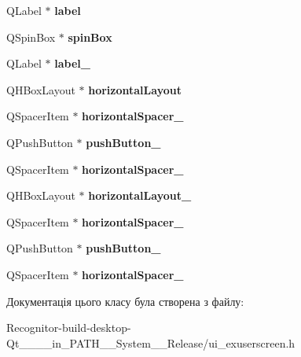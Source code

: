 \begin{DoxyCompactItemize}
\item 
\hypertarget{classUi__ExUserScreen_a05799742a0b74c8058aebabac80a4943}{Q\-Label $\ast$ {\bfseries label}}\label{classUi__ExUserScreen_a05799742a0b74c8058aebabac80a4943}

\item 
\hypertarget{classUi__ExUserScreen_a8e000c8945bfbbd9e91a1001f97ce6b0}{Q\-Spin\-Box $\ast$ {\bfseries spin\-Box}}\label{classUi__ExUserScreen_a8e000c8945bfbbd9e91a1001f97ce6b0}

\item 
\hypertarget{classUi__ExUserScreen_ab3f6f286a82c961f46f54918f346d7b3}{Q\-Label $\ast$ {\bfseries label\-\_}}\label{classUi__ExUserScreen_ab3f6f286a82c961f46f54918f346d7b3}

\item 
\hypertarget{classUi__ExUserScreen_abc80fe6702095d4adbe13f40207bcfc3}{Q\-H\-Box\-Layout $\ast$ {\bfseries horizontal\-Layout}}\label{classUi__ExUserScreen_abc80fe6702095d4adbe13f40207bcfc3}

\item 
\hypertarget{classUi__ExUserScreen_a9e0be9622eeeefbd45b87703b3968086}{Q\-Spacer\-Item $\ast$ {\bfseries horizontal\-Spacer\-\_}}\label{classUi__ExUserScreen_a9e0be9622eeeefbd45b87703b3968086}

\item 
\hypertarget{classUi__ExUserScreen_aac92023264e115d0601eaee5fae09ddf}{Q\-Push\-Button $\ast$ {\bfseries push\-Button\-\_}}\label{classUi__ExUserScreen_aac92023264e115d0601eaee5fae09ddf}

\item 
\hypertarget{classUi__ExUserScreen_ad388fc01774a6ad9100914452d5ba130}{Q\-Spacer\-Item $\ast$ {\bfseries horizontal\-Spacer\-\_}}\label{classUi__ExUserScreen_ad388fc01774a6ad9100914452d5ba130}

\item 
\hypertarget{classUi__ExUserScreen_a2a9ce1e768cc5cbd28de9d55c15f8018}{Q\-H\-Box\-Layout $\ast$ {\bfseries horizontal\-Layout\-\_}}\label{classUi__ExUserScreen_a2a9ce1e768cc5cbd28de9d55c15f8018}

\item 
\hypertarget{classUi__ExUserScreen_a085949386f33d45e979c5d82734efd24}{Q\-Spacer\-Item $\ast$ {\bfseries horizontal\-Spacer\-\_}}\label{classUi__ExUserScreen_a085949386f33d45e979c5d82734efd24}

\item 
\hypertarget{classUi__ExUserScreen_a224a14a86010a782348c2fcc14ec12b9}{Q\-Push\-Button $\ast$ {\bfseries push\-Button\-\_}}\label{classUi__ExUserScreen_a224a14a86010a782348c2fcc14ec12b9}

\item 
\hypertarget{classUi__ExUserScreen_a310830e48e61fcd344d64290e8802c25}{Q\-Spacer\-Item $\ast$ {\bfseries horizontal\-Spacer\-\_}}\label{classUi__ExUserScreen_a310830e48e61fcd344d64290e8802c25}

\end{DoxyCompactItemize}


Документація цього класу була створена з файлу\-:\begin{DoxyCompactItemize}
\item 
Recognitor-\/build-\/desktop-\/\-Qt\-\_\-\_\-\_\-\_\-in\-\_\-\-P\-A\-T\-H\-\_\-\-\_\-\-System\-\_\-\-\_\-\-Release/ui\-\_\-exuserscreen.\-h\end{DoxyCompactItemize}
